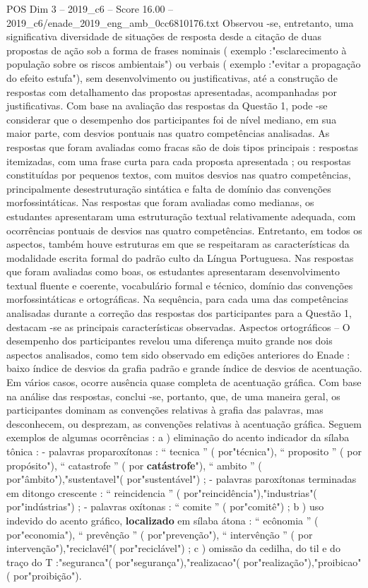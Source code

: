 \begin{textsample}{POS Dim 3 – 2019\_c6 – Score 16.00 – 2019\_c6/enade\_2019\_eng\_amb\_0cc6810176.txt}
Observou -se, entretanto, uma significativa diversidade de situações de resposta desde a citação de duas propostas de ação sob a forma de frases nominais ( exemplo :"esclarecimento à população sobre os riscos ambientais") ou verbais ( exemplo :"evitar a propagação do efeito estufa"), sem desenvolvimento ou justificativas, até a construção de respostas com detalhamento das propostas apresentadas, acompanhadas por justificativas.
Com base na avaliação das respostas da Questão 1, pode -se considerar que o desempenho dos participantes foi de nível mediano, em sua maior parte, com desvios pontuais nas quatro competências analisadas.
As respostas que foram avaliadas como fracas são de dois tipos principais : respostas itemizadas, com uma frase curta para cada proposta apresentada ; ou respostas constituídas por pequenos textos, com muitos desvios nas quatro competências, principalmente desestruturação sintática e falta de domínio das convenções morfossintáticas.
Nas respostas que foram avaliadas como medianas, os estudantes apresentaram uma estruturação textual relativamente adequada, com ocorrências pontuais de desvios nas quatro competências.
Entretanto, em todos os aspectos, também houve estruturas em que se respeitaram as características da modalidade escrita formal do padrão culto da Língua Portuguesa.
Nas respostas que foram avaliadas como boas, os estudantes apresentaram desenvolvimento textual fluente e coerente, vocabulário formal e técnico, domínio das convenções morfossintáticas e ortográficas.
Na sequência, para cada uma das competências analisadas durante a correção das respostas dos participantes para a Questão 1, destacam -se as principais características observadas.
Aspectos ortográficos – O desempenho dos participantes revelou uma diferença muito grande nos dois aspectos analisados, como tem sido observado em edições anteriores do Enade : baixo índice de desvios da grafia padrão e grande índice de desvios de acentuação.
Em vários casos, ocorre ausência quase completa de acentuação gráfica.
Com base na análise das respostas, conclui -se, portanto, que, de uma maneira geral, os participantes dominam as convenções relativas à grafia das palavras, mas desconhecem, ou desprezam, as convenções relativas à acentuação gráfica.
Seguem exemplos de algumas ocorrências : a ) eliminação do acento indicador da sílaba tônica : - palavras proparoxítonas : “ tecnica ” ( por"técnica"), “ proposito ” ( por propósito"), “ catastrofe ” ( por \textbf{catástrofe}"), “ ambito ” ( por"âmbito"),"sustentavel"( por"sustentável") ; - palavras paroxítonas terminadas em ditongo crescente : “ reincidencia ” ( por"reincidência"),"industrias"( por"indústrias") ; - palavras oxítonas : “ comite ” ( por"comitê") ; b ) uso indevido do acento gráfico, \textbf{localizado} em sílaba átona : “ ecônomia ” ( por"economia"), “ prevênção ” ( por"prevenção"), “ intervênção ” ( por intervenção"),"reciclavél"( por"reciclável") ; c ) omissão da cedilha, do til e do traço do T :"seguranca"( por"segurança"),"realizacao"( por"realização"),"proibicao"( por"proibição").

\end{textsample}
